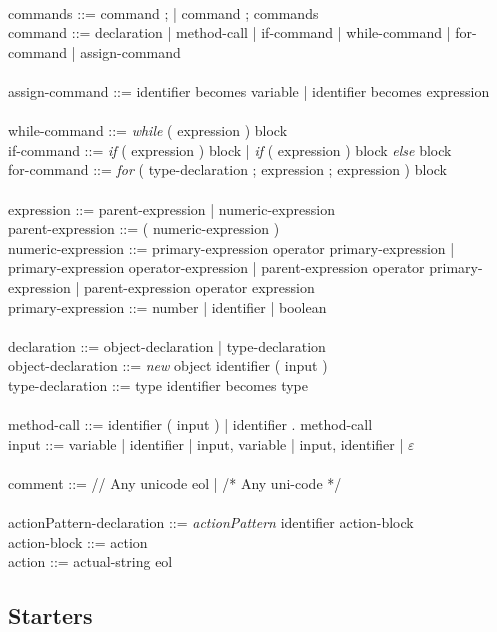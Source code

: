 \\
commands ::= command ; | command ; commands\\
command ::= declaration | method-call | if-command | while-command | for-command | assign-command\\
\\
assign-command ::= identifier becomes  variable | identifier becomes expression\\
\\
while-command ::= \textit{while} ( expression ) block\\
if-command ::= \textit{if} ( expression ) block | \textit{if} ( expression ) block \textit{else} block\\
for-command ::= \textit{for} ( type-declaration ; expression ; expression ) block\\
\\
expression ::= parent-expression | numeric-expression\\
parent-expression ::= ( numeric-expression )\\
numeric-expression ::= primary-expression operator primary-expression | primary-expression operator-expression | parent-expression operator primary-expression | parent-expression operator expression\\
primary-expression ::= number | identifier | boolean\\
\\
declaration ::= object-declaration | type-declaration\\
object-declaration ::= \textit{new} object identifier ( input ) \\
type-declaration ::= type identifier becomes type\\
\\
method-call ::= identifier ( input ) | identifier . method-call\\
input ::= variable | identifier | input, variable | input, identifier | $\varepsilon$ \\
\\
comment ::= // Any unicode eol | /* Any uni-code */\\
\\
actionPattern-declaration ::= \textit{actionPattern} identifier action-block\\
action-block ::= { action }\\
action ::= actual-string eol


\subsection{Starters}

